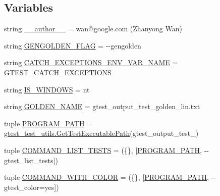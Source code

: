 \subsection*{Variables}
\begin{DoxyCompactItemize}
\item 
string \hyperlink{namespacegtest__output__test_a9549d664d25c13351c08bfe88072f5cf}{\+\_\+\+\_\+author\+\_\+\+\_\+} = \textquotesingle{}wan@google.\+com (Zhanyong Wan)\textquotesingle{}
\item 
string \hyperlink{namespacegtest__output__test_a25addad68fc28461f31e7f473bb7643f}{G\+E\+N\+G\+O\+L\+D\+E\+N\+\_\+\+F\+L\+A\+G} = \textquotesingle{}-\/-\/gengolden\textquotesingle{}
\item 
string \hyperlink{namespacegtest__output__test_a3b2d61497a354f214b5a086dcff420ee}{C\+A\+T\+C\+H\+\_\+\+E\+X\+C\+E\+P\+T\+I\+O\+N\+S\+\_\+\+E\+N\+V\+\_\+\+V\+A\+R\+\_\+\+N\+A\+M\+E} = \textquotesingle{}G\+T\+E\+S\+T\+\_\+\+C\+A\+T\+C\+H\+\_\+\+E\+X\+C\+E\+P\+T\+I\+O\+N\+S\textquotesingle{}
\item 
string \hyperlink{namespacegtest__output__test_a76e823e0e56e3c25aa8b0aab4431f763}{I\+S\+\_\+\+W\+I\+N\+D\+O\+W\+S} = \textquotesingle{}nt\textquotesingle{}
\item 
string \hyperlink{namespacegtest__output__test_a317ece7d11d9103a7bdbf0320b64a981}{G\+O\+L\+D\+E\+N\+\_\+\+N\+A\+M\+E} = \textquotesingle{}gtest\+\_\+output\+\_\+test\+\_\+golden\+\_\+lin.\+txt\textquotesingle{}
\item 
tuple \hyperlink{namespacegtest__output__test_a091d7c2220b9da215ddfa38130aaa49a}{P\+R\+O\+G\+R\+A\+M\+\_\+\+P\+A\+T\+H} = \hyperlink{namespacegtest__test__utils_a1bdf3cac86afa675ed37629b183048e9}{gtest\+\_\+test\+\_\+utils.\+Get\+Test\+Executable\+Path}(\textquotesingle{}gtest\+\_\+output\+\_\+test\+\_\+\textquotesingle{})
\item 
tuple \hyperlink{namespacegtest__output__test_ad57de209fb07e1002c8a929dd8a15dc9}{C\+O\+M\+M\+A\+N\+D\+\_\+\+L\+I\+S\+T\+\_\+\+T\+E\+S\+T\+S} = (\{\}, \mbox{[}\hyperlink{namespacegtest__output__test_a091d7c2220b9da215ddfa38130aaa49a}{P\+R\+O\+G\+R\+A\+M\+\_\+\+P\+A\+T\+H}, \textquotesingle{}-\/-\/gtest\+\_\+list\+\_\+tests\textquotesingle{}\mbox{]})
\item 
tuple \hyperlink{namespacegtest__output__test_adbeb34904b377333d8168d1b54584b53}{C\+O\+M\+M\+A\+N\+D\+\_\+\+W\+I\+T\+H\+\_\+\+C\+O\+L\+O\+R} = (\{\}, \mbox{[}\hyperlink{namespacegtest__output__test_a091d7c2220b9da215ddfa38130aaa49a}{P\+R\+O\+G\+R\+A\+M\+\_\+\+P\+A\+T\+H}, \textquotesingle{}-\/-\/gtest\+\_\+color=yes\textquotesingle{}\mbox{]})

\end{DoxyCompactItemize}
